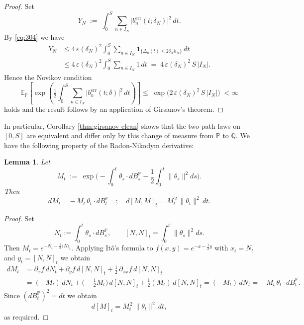 \documentclass[12pt,reqno]{amsart}
\theoremstyle{plain}
\newtheorem{lemma}[theorem]{Lemma}
\theoremstyle{definition}
\theoremstyle{remark}
\begin{document}
\begin{proof} 
Set
\begin{equation}
Y_N \;:=\; \int_0^S \sum_{n\in I_N} \bigl|b^{\mathrm{err}}_{n}(t ;\delta_N)\bigr|^2\,dt .
\end{equation}
By \eqref{eq:304} we have
\begin{align}
Y_N
&\le 4\,\varepsilon(\delta_N)^2
\int_0^S \sum_{n\in I_N}
\mathbf{1}_{\{\Delta_n(t)\le 2\delta_N h_N\}}\,dt \\
&\le 4\,\varepsilon(\delta_N)^2
\int_0^S \sum_{n\in I_N} 1 \, dt
\;=\; 4\,\varepsilon(\delta_N)^2\,S\,|I_N| .
\end{align}
Hence the Novikov condition
\begin{equation}
\label{eq:Novikov}
\mathbb E_{\mathbb P}\!\left[
\exp\!\left(\tfrac12\int_0^S \sum_{n\in I_N}\big|b^{\mathrm{err}}_{n}(t ; \delta)\big|^2\,dt\right)
\right] \le\; \exp\!\big(2\,\varepsilon(\delta_N)^2\,S\,|I_N|\big)
\; <\infty 
\end{equation}
holds and the result follows by an application of Girsanov’s theorem.
\end{proof}

In particular, Corollary \ref{thm:girsanov-clean} shows that the two path laws on $[0,S]$ are
equivalent and differ only by this change of measure from $\mathbb{P}$ to $\mathbb{Q}$. We have the following property of the Radon-Nikodym derivative:
\begin{lemma}\label{lem:d} Let
\begin{equation}
M_t \;:=\; \exp\!\Big(-\!\int_0^t \theta_s\!\cdot dB^{\mathbb P}_s
               - \frac12\int_0^t \|\theta_s\|^2ds\Big).
\end{equation}
Then 
\begin{equation}
dM_t = -\,M_t\,\theta_t\!\cdot dB^{\mathbb P}_t \quad ; \quad 
d[M,M]_t = M_t^{\,2}\,\|\theta_t\|^2\,dt. \label{eq:QV}
\end{equation}
\end{lemma}

\begin{proof}
Set
\begin{equation}
N_t:=\int_0^t \theta_s\!\cdot dB^{\mathbb P}_s,
\qquad
[ N,N]_t = \int_0^t \|\theta_s\|^2ds .
\end{equation}
Then $M_t=e^{-N_t-\frac12\langle N\rangle_t}$.
Applying It\^o’s formula to $f(x,y)=e^{-x-\frac12 y}$ with $x_t=N_t$ and $y_t=[ N,N]_t$ we obtain 
\begin{equation}
\begin{aligned}
dM_t
&= \partial_x f\, dN_t + \partial_y f\, d[ N,N]_t
   + \frac12\,\partial_{xx} f\, d[N,N]_t \\
&= (-M_t)\, dN_t + \Big(-\frac12M_t\Big)\, d[ N,N]_t
   + \frac12 (M_t)\, d[N,N]_t = (-M_t)\, dN_t=-\,M_t\,\theta_t\!\cdot dB^{\mathbb P}_t.
\end{aligned}
\end{equation}
Since $(dB^{\mathbb P}_t)^2=dt$ we obtain
\begin{equation}
d[M]_t = M_t^{\,2}\,\|\theta_t\|^2\,dt,
\end{equation}
as required.
\end{proof}
\end{document}
